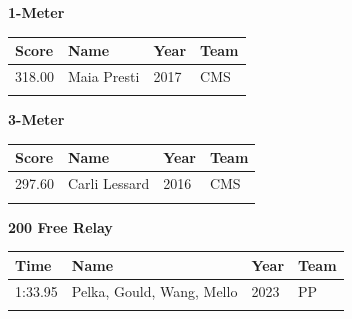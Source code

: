 \vspace{1.2em}
\noindent\begin{minipage}[t]{0.98\textwidth}
\centering
\textbf{\textcolor{teamprimary}{1-Meter}}\par
\vspace{0.5em}
\centering
\small
\renewcommand{\arraystretch}{1.0}
\setlength{\tabcolsep}{4pt}
\begin{tabular}{@{}p{2.5cm}p{4.5cm}p{1.5cm}p{2.5cm}@{}}
\toprule
\textbf{Score} & \textbf{Name} & \textbf{Year} & \textbf{Team} \\
\midrule
318.00 & Maia Presti & 2017 & CMS \\
\bottomrule
\vspace{0.5em}
\end{tabular}
\end{minipage}
\vspace{1.2em}
\noindent\begin{minipage}[t]{0.98\textwidth}
\centering
\textbf{\textcolor{teamprimary}{3-Meter}}\par
\vspace{0.5em}
\centering
\small
\renewcommand{\arraystretch}{1.0}
\setlength{\tabcolsep}{4pt}
\begin{tabular}{@{}p{2.5cm}p{4.5cm}p{1.5cm}p{2.5cm}@{}}
\toprule
\textbf{Score} & \textbf{Name} & \textbf{Year} & \textbf{Team} \\
\midrule
297.60 & Carli Lessard & 2016 & CMS \\
\bottomrule
\vspace{0.5em}
\end{tabular}
\end{minipage}
\vspace{1.2em}
\noindent\begin{minipage}[t]{0.98\textwidth}
\centering
\textbf{\textcolor{teamprimary}{200 Free Relay}}\par
\vspace{0.5em}
\centering
\small
\renewcommand{\arraystretch}{1.0}
\setlength{\tabcolsep}{4pt}
\begin{tabular}{@{}p{2.7cm}p{4.3cm}p{1.6cm}p{2.7cm}@{}}
\toprule
\textbf{Time} & \textbf{Name} & \textbf{Year} & \textbf{Team} \\
\midrule
1:33.95 & Pelka, Gould, Wang, Mello & 2023 & PP \\
\bottomrule
\vspace{0.5em}
\end{tabular}
\end{minipage}
\vspace{1.2em}
